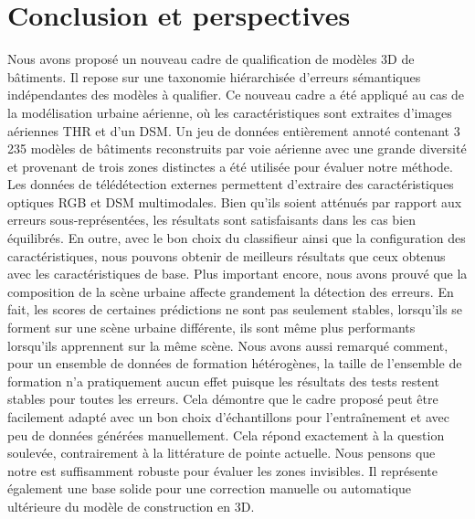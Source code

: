\section*{Conclusion et perspectives}
    Nous avons proposé un nouveau cadre de qualification de modèles 3D de bâtiments.
    Il repose sur une taxonomie hiérarchisée d'erreurs sémantiques indépendantes des modèles à qualifier.
    Ce nouveau cadre a été appliqué au cas de la modélisation urbaine aérienne, où les caractéristiques sont extraites d'images aériennes THR et d'un DSM.
    Un jeu de données entièrement annoté contenant 3 235 modèles de bâtiments reconstruits par voie aérienne avec une grande diversité et provenant de trois zones distinctes a été utilisée pour évaluer notre méthode.
    Les données de télédétection externes permettent d'extraire des caractéristiques optiques RGB et DSM multimodales.
    Bien qu'ils soient atténués par rapport aux erreurs sous-représentées, les résultats sont satisfaisants dans les cas bien équilibrés.
    En outre, avec le bon choix du classifieur ainsi que la configuration des caractéristiques, nous pouvons obtenir de meilleurs résultats que ceux obtenus avec les caractéristiques de base.
    Plus important encore, nous avons prouvé que la composition de la scène urbaine affecte grandement la détection des erreurs.
    En fait, les scores de certaines prédictions ne sont pas seulement stables, lorsqu'ils se forment sur une scène urbaine différente, ils sont même plus performants lorsqu'ils apprennent sur la même scène.
    Nous avons aussi remarqué comment, pour un ensemble de données de formation hétérogènes, la taille de l'ensemble de formation n'a pratiquement aucun effet puisque les résultats des tests restent stables pour toutes les erreurs.
    Cela démontre que le cadre proposé peut être facilement adapté avec un bon choix d'échantillons pour l'entraînement et avec peu de données générées manuellement.
    Cela répond exactement à la question soulevée, contrairement à la littérature de pointe actuelle.
    Nous pensons que notre est suffisamment robuste pour évaluer les zones invisibles.
    Il représente également une base solide pour une correction manuelle ou automatique ultérieure du modèle de construction en 3D.
